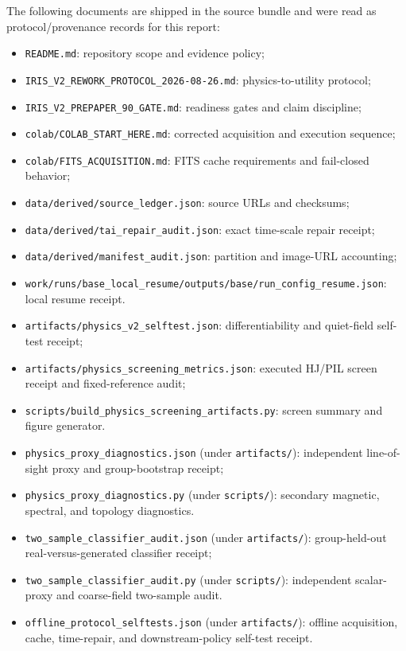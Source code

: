 \documentclass[11pt,oneside]{report}
\begin{document}
The following documents are shipped in the source bundle and were read as protocol/provenance records for this report:

\begin{itemize}
\item \texttt{README.md}: repository scope and evidence policy;
\item \texttt{IRIS\_V2\_REWORK\_PROTOCOL\_2026-08-26.md}: physics-to-utility protocol;
\item \texttt{IRIS\_V2\_PREPAPER\_90\_GATE.md}: readiness gates and claim discipline;
\item \texttt{colab/COLAB\_START\_HERE.md}: corrected acquisition and execution sequence;
\item \texttt{colab/FITS\_ACQUISITION.md}: FITS cache requirements and fail-closed behavior;
\item \texttt{data/derived/source\_ledger.json}: source URLs and checksums;
\item \texttt{data/derived/tai\_repair\_audit.json}: exact time-scale repair receipt;
\item \texttt{data/derived/manifest\_audit.json}: partition and image-URL accounting;
\item \texttt{work/runs/base\_local\_resume/outputs/base/run\_config\_resume.json}: local resume receipt.
\item \texttt{artifacts/physics\_v2\_selftest.json}: differentiability and quiet-field self-test receipt;
\item \texttt{artifacts/physics\_screening\_metrics.json}: executed HJ/PIL screen receipt and fixed-reference audit;
\item \texttt{scripts/build\_physics\_screening\_artifacts.py}: screen summary and figure generator.
\item \texttt{physics\_proxy\_diagnostics.json} (under \texttt{artifacts/}): independent line-of-sight proxy and group-bootstrap receipt;
\item \texttt{physics\_proxy\_diagnostics.py} (under \texttt{scripts/}): secondary magnetic, spectral, and topology diagnostics.
\item \texttt{two\_sample\_classifier\_audit.json} (under \texttt{artifacts/}): group-held-out real-versus-generated classifier receipt;
\item \texttt{two\_sample\_classifier\_audit.py} (under \texttt{scripts/}): independent scalar-proxy and coarse-field two-sample audit.
\item \texttt{offline\_protocol\_selftests.json} (under \texttt{artifacts/}): offline acquisition, cache, time-repair, and downstream-policy self-test receipt.

\end{itemize}
\end{document}
